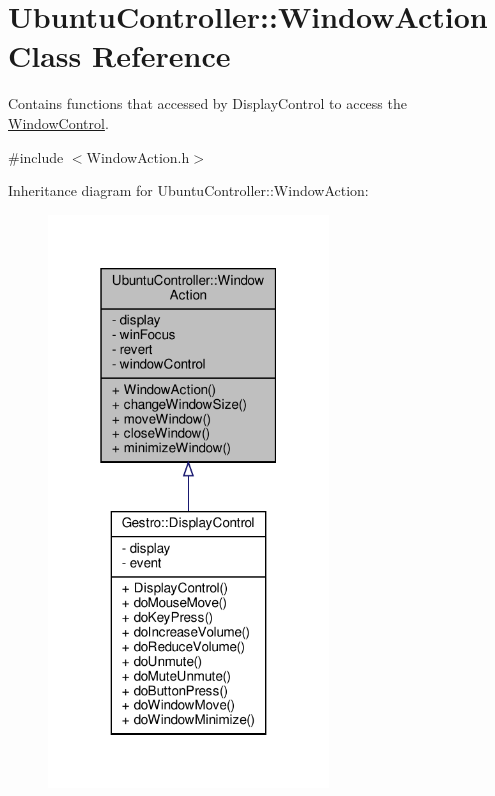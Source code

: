 \hypertarget{class_ubuntu_controller_1_1_window_action}{}\section{Ubuntu\+Controller\+:\+:Window\+Action Class Reference}
\label{class_ubuntu_controller_1_1_window_action}


Contains functions that accessed by Display\+Control to access the \hyperlink{class_ubuntu_controller_1_1_window_control}{Window\+Control}.  




{\ttfamily \#include $<$Window\+Action.\+h$>$}



Inheritance diagram for Ubuntu\+Controller\+:\+:Window\+Action\+:
\nopagebreak
\begin{figure}[H]
\begin{center}
\leavevmode
\includegraphics[width=211pt]{class_ubuntu_controller_1_1_window_action__inherit__graph}
\end{center}
\end{figure}


